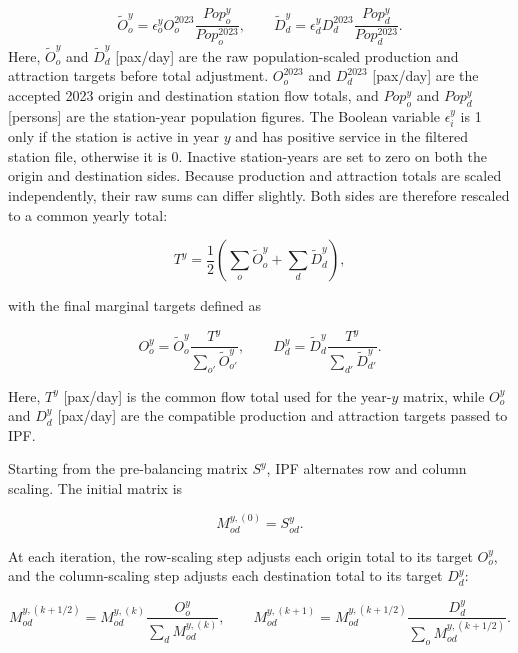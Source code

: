 \documentclass[preprint,12pt]{elsarticle}
\begin{document}
\begin{equation}
  \widetilde O^y_o
  =
  \epsilon^y_o O^{2023}_o
  \frac{Pop^y_o}{Pop^{2023}_o},
  \qquad
  \widetilde D^y_d
  =
  \epsilon^y_d D^{2023}_d
  \frac{Pop^y_d}{Pop^{2023}_d}.
  \label{eq:historical-raw-population-marginals}
\end{equation}
Here, $\widetilde O^y_o$ and $\widetilde D^y_d$ [pax/day] are the raw population-scaled production and attraction targets before total adjustment. $O^{2023}_o$ and $D^{2023}_d$ [pax/day] are the accepted 2023 origin and destination station flow totals, and $Pop^y_o$ and $Pop^y_d$ [persons] are the station-year population figures. The Boolean variable $\epsilon^y_i$ is 1 only if the station is active in year $y$ and has positive service in the filtered station file, otherwise it is 0. Inactive station-years are set to zero on both the origin and destination sides. Because production and attraction totals are scaled independently, their raw sums can differ slightly. Both sides are therefore rescaled to a common yearly total:

\begin{equation}
  T^y
  =
  \frac{1}{2}
  \left(
    \sum_o \widetilde O^y_o
    +
    \sum_d \widetilde D^y_d
  \right),
  \label{eq:historical-common-total}
\end{equation}

with the final marginal targets defined as

\begin{equation}
  O^y_o
  =
  \widetilde O^y_o
  \frac{T^y}{\sum_{o'} \widetilde O^y_{o'}},
  \qquad
  D^y_d
  =
  \widetilde D^y_d
  \frac{T^y}{\sum_{d'} \widetilde D^y_{d'}}.
  \label{eq:historical-rescaled-marginals}
\end{equation}

Here, $T^y$ [pax/day] is the common flow total used for the year-$y$ matrix, while $O^y_o$ and $D^y_d$ [pax/day] are the compatible production and attraction targets passed to IPF.

Starting from the pre-balancing matrix $S^y$, IPF alternates row and column scaling. The initial matrix is

\[
  M^{y,(0)}_{od}=S^y_{od}.
\]

At each iteration, the row-scaling step adjusts each origin total to its target $O^y_o$, and the column-scaling step adjusts each destination total to its target $D^y_d$:

\begin{equation}
  M^{y,(k+1/2)}_{od}
  =
  M^{y,(k)}_{od}
  \frac{O^y_o}{\sum_d M^{y,(k)}_{od}},
  \qquad
  M^{y,(k+1)}_{od}
  =
  M^{y,(k+1/2)}_{od}
  \frac{D^y_d}{\sum_o M^{y,(k+1/2)}_{od}}.
  \label{eq:historical-ipf}
\end{equation}
\end{document}

